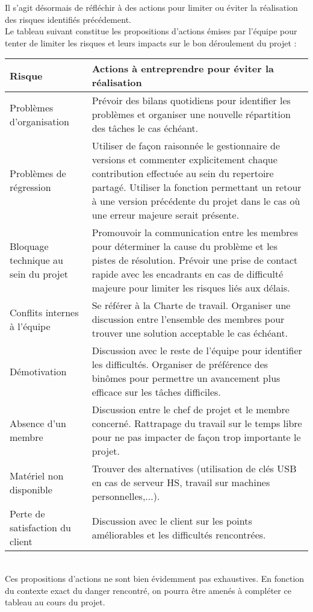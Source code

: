 \documentclass[a4paper,11pt]{article}
\begin{document}
Il s'agit désormais de réfléchir à des actions pour limiter ou éviter la réalisation des risques identifiés précédement.\\

Le tableau suivant constitue les propositions d'actions émises par l'équipe pour tenter de limiter les risques et leurs impacts sur le bon déroulement du projet : \\

\begin{tabular}{|p{5cm}||p{12cm}|}
\hline  
   Risque & Actions à entreprendre pour éviter la réalisation \\
\hline
\hline
   Problèmes d'organisation & Prévoir des bilans quotidiens pour 
identifier les problèmes et organiser une nouvelle répartition des tâches le cas échéant. \\
\hline
   Problèmes de régression & Utiliser de façon raisonnée le gestionnaire de versions et 
commenter explicitement chaque contribution effectuée au sein du repertoire partagé. Utiliser la fonction permettant un retour à une version précédente du projet dans le cas où une erreur majeure serait présente.\\
\hline
Bloquage technique au sein du projet & Promouvoir la communication entre les membres pour déterminer la cause du problème et les pistes de résolution. Prévoir une prise de contact rapide avec les encadrants en cas de difficulté majeure pour limiter les risques liés aux délais.\\
\hline
   Conflits internes à l'équipe & Se référer à la Charte de travail. Organiser une discussion entre l'ensemble des membres pour trouver une solution acceptable le cas échéant.\\
\hline
   Démotivation & Discussion avec le reste de l'équipe pour identifier les difficultés. Organiser de préférence des binômes pour permettre un avancement plus efficace sur les tâches difficiles.\\
\hline
   Absence d'un membre & Discussion entre le chef de projet et le membre concerné. Rattrapage du travail sur le temps libre pour ne pas impacter de façon trop importante le projet.\\
\hline
   Matériel non disponible & Trouver des alternatives (utilisation de clés USB en cas de serveur HS, travail sur machines personnelles,...).\\   
\hline
   Perte de satisfaction du client & Discussion avec le client sur les points améliorables et les difficultés rencontrées.\\ 

\hline
\end{tabular}\\

Ces propositions d'actions ne sont bien évidemment pas exhaustives. En fonction du contexte exact du danger rencontré, on pourra être amenés à compléter ce tableau au cours du projet.\\
\end{document}
